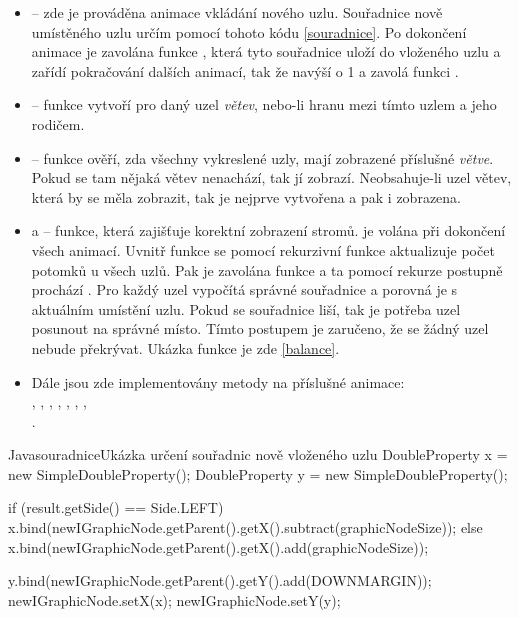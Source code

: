 \documentclass[
  biblatex=false,
  font=serif,
  glossaries=false,
  tables=false,
  theorems=false,
  index
]{kidiplom}
\begin{document}
\begin{itemize}
\item {} -- zde je prováděna animace vkládání nového uzlu. Souřadnice nově umístěného uzlu určím pomocí tohoto kódu \ref{souradnice}. Po dokončení animace je zavolána funkce , která tyto souřadnice uloží do vloženého uzlu a zařídí pokračování dalších animací, tak že navýší  o 1 a zavolá funkci .

\item {} -- funkce vytvoří pro daný uzel \textit{větev}, nebo-li hranu mezi tímto uzlem a jeho rodičem.

\item {} -- funkce ověří, zda všechny vykreslené uzly, mají zobrazené příslušné \textit{větve}. Pokud se tam nějaká větev nenachází, tak jí zobrazí. Neobsahuje-li uzel větev, která by se měla zobrazit, tak je nejprve vytvořena a pak i zobrazena.

\item {} a  -- funkce, která zajišťuje korektní zobrazení stromů.  je volána při dokončení všech animací. Uvnitř funkce se pomocí rekurzivní funkce  aktualizuje počet potomků u všech uzlů. Pak je zavolána funkce  a ta pomocí rekurze postupně prochází . Pro každý uzel vypočítá správné souřadnice a porovná je s aktuálním umístění uzlu. Pokud se souřadnice liší, tak je potřeba uzel posunout na správné místo. Tímto postupem je zaručeno, že se žádný uzel nebude překrývat. Ukázka funkce je zde \ref{balance}.
\item Dále jsou zde implementovány metody na příslušné animace: \\, , , , , , ,\\.
\end{itemize}

\begin{kicode}{Java}{souradnice}{Ukázka určení souřadnic nově vloženého uzlu}
DoubleProperty x = new SimpleDoubleProperty();
DoubleProperty y = new SimpleDoubleProperty();

if (result.getSide() == Side.LEFT) {
	x.bind(newIGraphicNode.getParent().getX().subtract(graphicNodeSize));	
} else {
	x.bind(newIGraphicNode.getParent().getX().add(graphicNodeSize));	
}
	
y.bind(newIGraphicNode.getParent().getY().add(DOWNMARGIN));	
newIGraphicNode.setX(x);
newIGraphicNode.setY(y);
\end{kicode}
\end{document}
